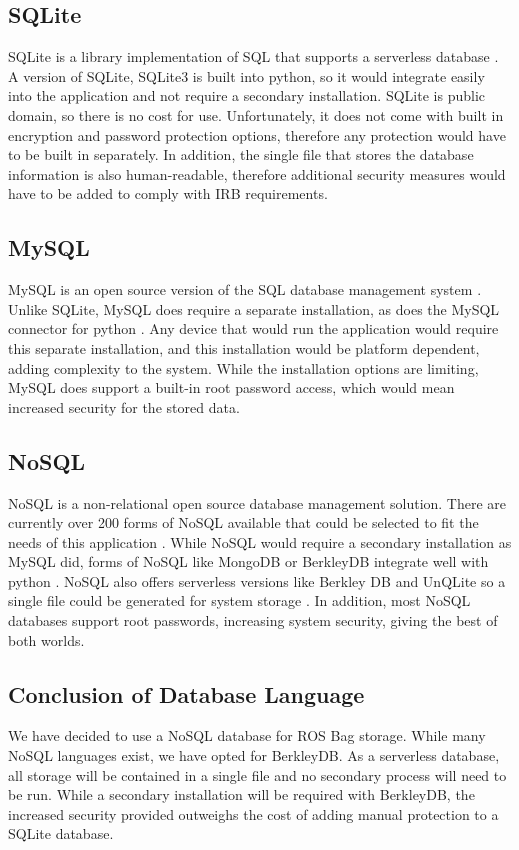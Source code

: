 \documentclass[onecolumn, draftclsnofoot,10pt, compsoc]{report}
\begin{document}
\subsection{SQLite}
SQLite is a library implementation of SQL that supports a serverless database \cite{AboutSQLite}. A version of SQLite, SQLite3 is built into python\cite{SQLitePython}, so it would integrate easily into the application and not require a secondary installation. SQLite is public domain, so there is no cost for use. Unfortunately, it does not come with built in encryption and password protection options, therefore any protection would have to be built in separately. In addition, the single file that stores the database information is also human-readable, therefore additional security measures would have to be added to comply with IRB requirements\cite{AboutSQLite, SQLiteTutorial}.
\subsection{MySQL}
MySQL is an open source version of the SQL database management system \cite{WhatIsMySQL}. Unlike SQLite, MySQL does require a separate installation, as does the MySQL connector for python \cite{MySQLForPython}. Any device that would run the application would require this separate installation, and this installation would be platform dependent, adding complexity to the system. While the installation options are limiting, MySQL does support a built-in root password access, which would mean increased security for the stored data.
\subsection{NoSQL}
NoSQL is a non-relational open source database management solution. There are currently over 200 forms of NoSQL available that could be selected to fit the needs of this application \cite{WhatisNoSQL}. While NoSQL would require a secondary installation as MySQL did, forms of NoSQL like MongoDB or BerkleyDB integrate well with python \cite{MongoDB, BerkleyDB}. NoSQL also offers serverless versions like Berkley DB and UnQLite so a single file could be generated for system storage \cite{BerkleyDB, UnQLite}. In addition, most NoSQL databases support root passwords, increasing system security, giving the best of both worlds.
\subsection{Conclusion of Database Language}
We have decided to use a NoSQL database for ROS Bag storage. While many NoSQL languages exist, we have opted for BerkleyDB. As a serverless database, all storage will be contained in a single file and no secondary process will need to be run. While a secondary installation will be required with BerkleyDB, the increased security provided outweighs the cost of adding manual protection to a SQLite database.  
\end{document}
